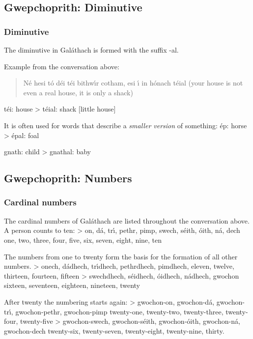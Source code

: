 \subsection{Gwepchoprith: Diminutive}
\subsubsection{Diminutive}

The diminutive in Gal\'{a}thach is formed with the suffix -al.

Example from the conversation above:

\begin{quote}
N\'{e} hesi t\'{o} d\'{e}i t\'{e}i bithw\'{\i}r cotham, esi \'{\i} in h\'{o}nach t\'{e}ial (your house is not even a real house, it is only a shack)
\end{quote}

t\'{e}i: house
> t\'{e}ial: shack [little house]

It is often used for words that describe a \textit{smaller version} of something:
\'{e}p: horse
> \'{e}pal: foal

gnath: child
> gnathal: baby

\subsection{Gwepchoprith: Numbers}
\subsubsection{Cardinal numbers}

The cardinal numbers of Gal\'{a}thach are listed throughout the conversation above. A person counts to ten:
> on, d\'{a}, tr\'{\i}, pethr, pimp, swech, s\'{e}ith, \'{o}ith, n\'{a}, dech
one, two, three, four, five, six, seven, eight, nine, ten

The numbers from one to twenty form the basis for the formation of all other numbers.
> onech, d\'{a}dhech, tr\'{\i}dhech, pethrdhech, pimdhech,
eleven, twelve, thirteen, fourteen,  fifteen
> swechdhech, s\'{e}idhech, \'{o}idhech, n\'{a}dhech, gwochon
sixteen,  seventeen, eighteen, nineteen, twenty

After twenty the numbering starts again:
> gwochon-on, gwochon-d\'{a}, gwochon-tr\'{\i}, gwochon-pethr, gwochon-pimp
twenty-one, twenty-two, twenty-three, twenty-four, twenty-five
> gwochon-swech, gwochon-s\'{e}ith, gwochon-\'{o}ith, gwochon-n\'{a}, gwochon-dech
twenty-six, twenty-seven, twenty-eight, twenty-nine, thirty.

